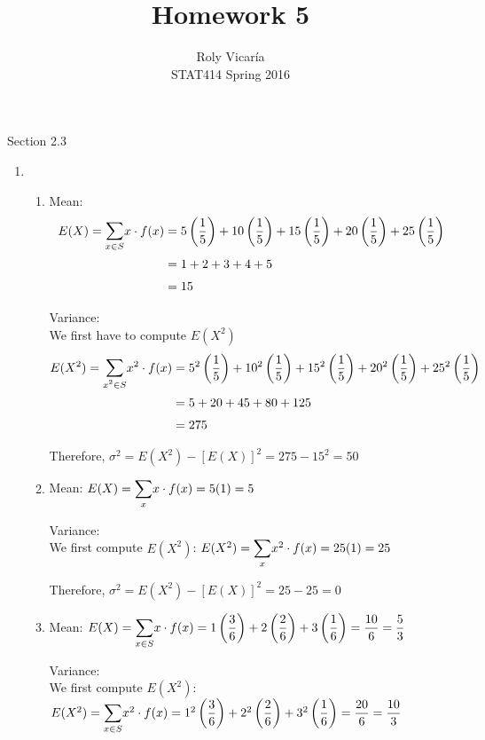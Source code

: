 \documentclass{article}
\title{Homework 5}
\author{Roly Vicar\'ia \\ STAT414 Spring 2016}
\begin{document}
    
    \maketitle
    
    Section 2.3
    \begin{enumerate}
      
      \item
	\begin{enumerate}
	 \item 
	  Mean:
	  \begin{align*}
	    E(X) = \mathlarger{\sum}_{x \in S}{x \cdot f(x)} &= 5 \left(\dfrac{1}{5}\right)
	    + 10 \left(\dfrac{1}{5}\right) + 15 \left(\dfrac{1}{5}\right) 
	    + 20 \left(\dfrac{1}{5}\right) + 25 \left(\dfrac{1}{5}\right) \\
	    &= 1 + 2 + 3 + 4 + 5 \\
	    &= 15
	  \end{align*}
	  
	  Variance: \\
	  We first have to compute $E(X^2)$
	  \begin{align*}
	    E(X^2) = \mathlarger{\sum}_{x^2 \in S}{x^2 \cdot f(x)} &= 5^2 \left(\dfrac{1}{5}\right)
	      + 10^2 \left(\dfrac{1}{5}\right) + 15^2 \left(\dfrac{1}{5}\right)
	      + 20^2 \left(\dfrac{1}{5}\right) + 25^2 \left(\dfrac{1}{5}\right) \\
	      &= 5 + 20 + 45 + 80 + 125 \\
	      &= 275
	  \end{align*}
	  
	  Therefore, $\sigma^2 = E(X^2) - [E(X)]^2 = 275 - 15^2 = 50$
	  
	 \item
	  Mean:
	    $E(X) = \mathlarger{\sum}_x{x \cdot f(x)} = 5(1) = 5$
	    
	  Variance: \\
	  We first compute $E(X^2)$: $E(X^2) = \mathlarger{\sum}_x{x^2 \cdot f(x)} = 25(1) = 25$
	  
	  Therefore, $\sigma^2 = E(X^2) - [E(X)]^2 = 25 - 25 = 0$
	  
	 \item
	  Mean: 
	    $E(X) = \mathlarger{\sum}_{x \in S}{x \cdot f(x)} = 1 \left(\dfrac{3}{6}\right)
		+ 2 \left(\dfrac{2}{6}\right) + 3 \left(\dfrac{1}{6}\right) = \dfrac{10}{6} 
		= \dfrac{5}{3}$
		
	  Variance:\\
	  We first compute $E(X^2)$: \\
	  $E(X^2) = \mathlarger{\sum}_{x \in S}{x^2 \cdot f(x)} = 1^2 \left(\dfrac{3}{6}\right)
		+ 2^2 \left(\dfrac{2}{6}\right) + 3^2 \left(\dfrac{1}{6}\right) 
		= \dfrac{20}{6} = \dfrac{10}{3}$
		

\end{enumerate}
\end{enumerate}
\end{document}

